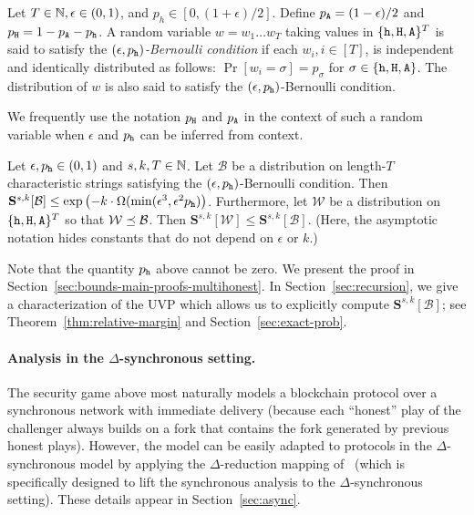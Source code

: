   \begin{definition}\label{def:bernoulli-cond}
    Let $T \in \mathbb{N}, \epsilon \in (0,1)$, and
    $p_h \in [0,(1+\epsilon)/2]$. Define $p_{\mathtt{A}} = (1-\epsilon)/2$ and
    $p_{\mathtt{H}} = 1- p_{\mathtt{A}} - p_{\mathtt{h}}$.  A random variable $w = w_1 \ldots w_T$
    taking values in $\{\mathtt{h}, \mathtt{H}, \mathtt{A}\}^T$ is said to satisfy the
    \emph{$(\epsilon, p_{\mathtt{h}})$-Bernoulli condition} if each
    $w_i, i \in [T]$, is independent and identically distributed as
    follows: $\Pr[w_i = \sigma] = p_\sigma$ for
    $\sigma \in \{\mathtt{h}, \mathtt{H}, \mathtt{A}\}$.  The distribution of $w$ is also said
    to satisfy the $(\epsilon, p_{\mathtt{h}})$-Bernoulli condition.

    We frequently use the notation $p_{\mathtt{H}}$ and $p_{\mathtt{A}}$ in the context of
    such a random variable when $\epsilon$ and $p_{\mathtt{h}}$ can be inferred
    from context.
  \end{definition}
  
  \begin{theorem}\label{thm:main-mh}
    Let $\epsilon, p_{\mathtt{h}} \in (0, 1)$ and $s, k, T \in \mathbb{N}$.  
    Let $\mathcal{B}$ be a distribution 
    on length-$T$ characteristic strings satisfying 
    the $(\epsilon, p_{\mathtt{h}})$-Bernoulli condition.
    Then 
    $
      \mathbf{S}^{s,k}[\mathcal{B}] 
        \leq 
        \exp\left(-k\cdot \Omega( 
          \min(\epsilon^3, \epsilon^2 p_{\mathtt{h}}) 
        \right)
    $.
    Furthermore, 
    let 
    $\mathcal{W}$ be a distribution on
    $\{\mathtt{h}, \mathtt{H}, \mathtt{A}\}^T$ so that 
    $\mathcal{W} \preceq \mathcal{B}$. 
    Then $\mathbf{S}^{s,k}[\mathcal{W}] 
        \leq \mathbf{S}^{s,k}[\mathcal{B}]$.   
    (Here, the asymptotic notation hides constants that do not depend on $\epsilon$ or $k$.)
  \end{theorem}
  Note that the quantity $p_{\mathtt{h}}$ above cannot be zero.
  We present the proof in Section~\ref{sec:bounds-main-proofs-multihonest}. 
  In Section~\ref{sec:recursion}, 
  we give a characterization of the UVP which 
  allows us to explicitly compute $\mathbf{S}^{s,k}[\mathcal{B}]$; 
  see 
  Theorem~\ref{thm:relative-margin} and 
  Section~\ref{sec:exact-prob}.


  \paragraph{Analysis in the $\Delta$-synchronous setting.} The security
   game above most naturally models a blockchain protocol over a
   synchronous network with immediate delivery (because each ``honest''
   play of the challenger always builds on a fork that contains the fork
   generated by previous honest plays). However, the model can be easily
   adapted to protocols in the $\Delta$-synchronous model by applying
   the $\Delta$-reduction mapping of~\cite{Praos} (which is specifically
   designed to lift the synchronous analysis to the $\Delta$-synchronous
   setting).
   These details appear in Section~\ref{sec:async}.



